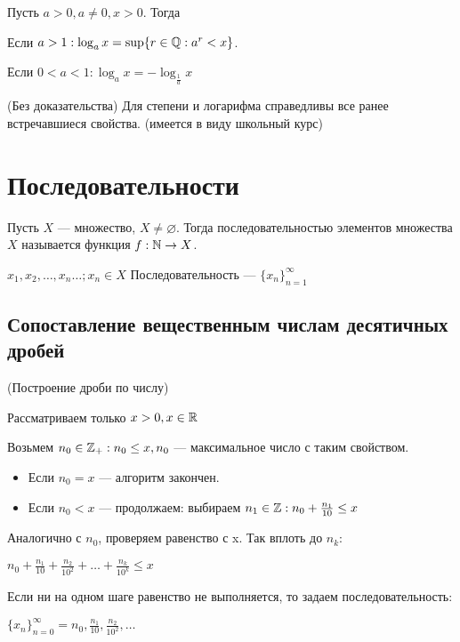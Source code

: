 \begin{definition}
    Пусть $a > 0, a \neq 0, x > 0$. Тогда 
    
    Если $a > 1: \log_a x = \sup\{r \in \mathbb{Q}: a^r < x\}$.

    Если $0 < a < 1: \log_a x = -\log_{\frac{1}{a}} x$
\end{definition}

\begin{theorem} (Без доказательства)
    Для степени и логарифма справедливы все ранее встречавшиеся свойства. (имеется в виду школьный курс)
\end{theorem}

\chapter{Последовательности}

\begin{definition}
    Пусть $X$ --- множество, $X \neq \varnothing$. Тогда последовательностью элементов множества $X$ называется функция $f: \mathbb{N} \to X$.

    $x_1, x_2, \ldots, x_n \ldots; x_n \in X$ Последовательность --- $\{x_n\}_{n=1}^{\infty}$
\end{definition}

\section{Сопоставление вещественным числам десятичных дробей}

\begin{algoritm} (Построение дроби по числу)
    
    Рассматриваем только $x > 0, x \in \mathbb{R}$

    Возьмем $n_0 \in \mathbb{Z}_+: n_0 \leq x, n_0$ --- максимальное число с таким свойством.

    \begin{itemize}
        \item Если $n_0 = x$ --- алгоритм закончен.
        \item Если $n_0 < x$ --- продолжаем: выбираем $n_1 \in \mathbb{Z}: n_0 + \frac{n_1}{10} \leq x$
        
    \end{itemize}

    Аналогично с $n_0$, проверяем равенство с x. Так вплоть до $n_k$:

    $n_0 + \frac{n_1}{10} + \frac{n_2}{10^2} + \ldots + \frac{n_k}{10^k} \leq x$

    Если ни на одном шаге равенство не выполняется, то задаем последовательность:

    $\{x_n\}_{n=0}^{\infty} = n_0, \frac{n_1}{10}, \frac{n_2}{10^2}, \ldots$
\end{algoritm}

